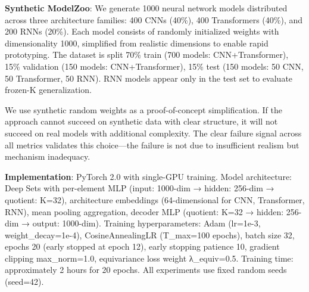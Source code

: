 
\textbf{Synthetic ModelZoo}: We generate 1000 neural network models distributed across three architecture families: 400 CNNs (40\%), 400 Transformers (40\%), and 200 RNNs (20\%). Each model consists of randomly initialized weights with dimensionality 1000, simplified from realistic dimensions to enable rapid prototyping. The dataset is split 70\% train (700 models: CNN+Transformer), 15\% validation (150 models: CNN+Transformer), 15\% test (150 models: 50 CNN, 50 Transformer, 50 RNN). RNN models appear only in the test set to evaluate frozen-K generalization.

We use synthetic random weights as a proof-of-concept simplification. If the approach cannot succeed on synthetic data with clear structure, it will not succeed on real models with additional complexity. The clear failure signal across all metrics validates this choice—the failure is not due to insufficient realism but mechanism inadequacy.

\textbf{Implementation}: PyTorch 2.0 with single-GPU training. Model architecture: Deep Sets with per-element MLP (input: 1000-dim → hidden: 256-dim → quotient: K=32), architecture embeddings (64-dimensional for {CNN, Transformer, RNN}), mean pooling aggregation, decoder MLP (quotient: K=32 → hidden: 256-dim → output: 1000-dim). Training hyperparameters: Adam (lr=1e-3, weight_decay=1e-4), CosineAnnealingLR (T_max=100 epochs), batch size 32, epochs 20 (early stopped at epoch 12), early stopping patience 10, gradient clipping max_norm=1.0, equivariance loss weight λ_equiv=0.5. Training time: approximately 2 hours for 20 epochs. All experiments use fixed random seeds (seed=42).

